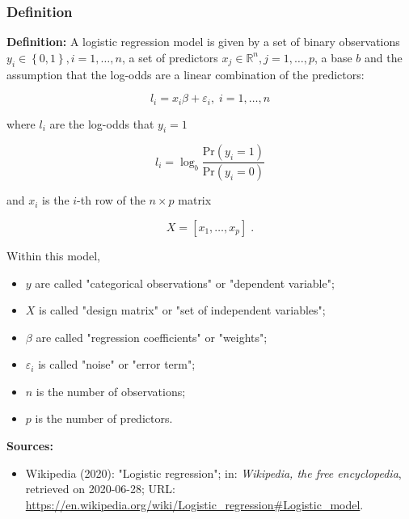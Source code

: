 \documentclass[a4paper,12pt,twoside]{book}
\begin{document}
\subsubsection[\textit{Definition}]{Definition} \label{sec:logreg}
\setcounter{equation}{0}

\textbf{Definition:} A logistic regression model is given by a set of binary observations $y_i \in \left\lbrace 0, 1 \right\rbrace, i = 1,\ldots,n$, a set of predictors $x_j \in \mathbb{R}^n, j = 1,\ldots,p$, a base $b$ and the assumption that the log-odds are a linear combination of the predictors:

\begin{equation} \label{eq:logreg-logreg}
l_i = x_i \beta + \varepsilon_i, \; i = 1,\ldots,n
\end{equation}

where $l_i$ are the log-odds that $y_i = 1$

\begin{equation} \label{eq:logreg-logodds}
l_i = \log_b \frac{\mathrm{Pr}(y_i = 1)}{\mathrm{Pr}(y_i = 0)}
\end{equation}

and $x_i$ is the $i$-th row of the $n \times p$ matrix

\begin{equation} \label{eq:logreg-X}
X = \left[ x_1, \ldots, x_p \right] \; .
\end{equation}

Within this model,

\begin{itemize}

\item $y$ are called "categorical observations" or "dependent variable";

\item $X$ is called "design matrix" or "set of independent variables";

\item $\beta$ are called "regression coefficients" or "weights";

\item $\varepsilon_i$ is called "noise" or "error term";

\item $n$ is the number of observations;

\item $p$ is the number of predictors.

\end{itemize}


\vspace{1em}
\textbf{Sources:}
\begin{itemize}
\item Wikipedia (2020): "Logistic regression"; in: \textit{Wikipedia, the free encyclopedia}, retrieved on 2020-06-28; URL: \url{https://en.wikipedia.org/wiki/Logistic_regression#Logistic_model}.
\end{itemize}
\end{document}
